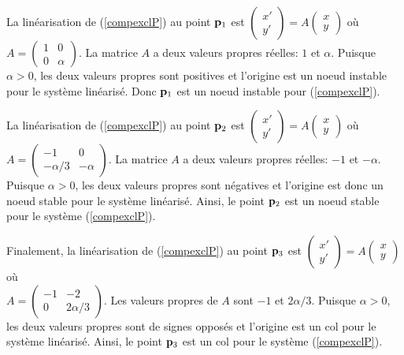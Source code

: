 {\begin{egg}
La linéarisation de (\ref{compexclP}) au point $\mathbf{p}_1$ est
$\begin{pmatrix} x' \\ y' \end{pmatrix} = A
\begin{pmatrix} x \\ y \end{pmatrix}$ où
$\displaystyle A = \begin{pmatrix} 1 & 0 \\ 0 & \alpha \end{pmatrix}$.
La matrice $A$ a deux valeurs propres réelles: $1$ et $\alpha$.  Puisque
$\alpha >0$, les deux valeurs propres sont positives et l'origine est
un noeud instable pour le système linéarisé.  Donc $\mathbf{p}_1$ est un
noeud instable pour (\ref{compexclP}).

La linéarisation de (\ref{compexclP}) au point $\mathbf{p}_2$ est
$\begin{pmatrix} x' \\ y' \end{pmatrix} = A
\begin{pmatrix} x \\ y \end{pmatrix}$ où
$\displaystyle A = \begin{pmatrix} -1 & 0 \\-\alpha/3 & -\alpha \end{pmatrix}$.
La matrice $A$ a deux valeurs propres réelles: $-1$ et $-\alpha$.  Puisque
$\alpha >0$, les deux valeurs propres sont négatives et l'origine est donc
un noeud stable pour le système linéarisé.  Ainsi, 
le point $\mathbf{p}_2$ est un noeud stable pour le système (\ref{compexclP}).

Finalement, la linéarisation de (\ref{compexclP}) au point $\mathbf{p}_3$
est $\begin{pmatrix} x' \\ y' \end{pmatrix} = A
\begin{pmatrix} x \\ y \end{pmatrix}$ où \\
$\displaystyle A = \begin{pmatrix} -1 & -2 \\ 0 & 2\alpha/3 \end{pmatrix}$.
Les valeurs propres de $A$ sont $-1$ et $2\alpha/3$.  Puisque
$\alpha>0$, les deux valeurs propres sont de signes opposés et
l'origine est un col pour le système linéarisé.  Ainsi, le point
$\mathbf{p}_3$ est un col pour le système (\ref{compexclP}).


\end{egg}}
